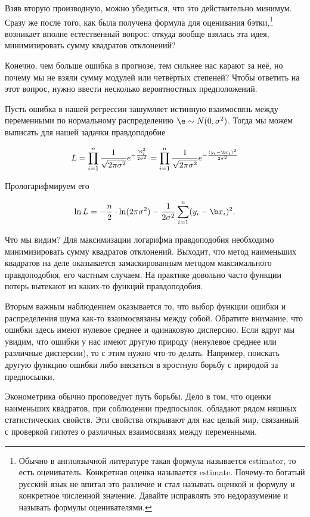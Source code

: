 \documentclass[12pt, a4paper, oneside]{article}
\begin{document}
Взяв вторую производную, можно убедиться, что это действительно минимум.  Сразу же после того, как была получена формула для оценивания бэтки,\footnote{Обычно в англоязычной литературе такая формула называется estimator, то есть оцениватель. Конкретная оценка называется estimate. Почему-то богатый русский язык не впитал это различие и стал называть оценкой и формулу и конкретное численной значение. Давайте исправлять это недоразумение и называть формулы оценивателями.} возникает вполне естественный вопрос: откуда вообще взялась эта идея, минимизировать сумму квадратов отклонений?  

Конечно, чем больше ошибка в прогнозе, тем сильнее нас карают за неё, но почему мы не взяли сумму модулей или четвёртых степеней?  Чтобы ответить на этот вопрос, нужно ввести несколько вероятностных предположений. 

Пусть ошибка в нашей регрессии  зашумляет истинную взаимосвязь между переменными по нормальному распределению $\e \sim N(0, \sigma^2)$. Тогда мы можем выписать для нашей задачки  правдоподобие

\[ L =  \prod_{i=1}^{n} \frac{1}{\sqrt{2\pi \sigma^2}} e^{- \frac{\e_i^2}{2 \sigma^2}   } =  \prod_{i=1}^{n} \frac{1}{\sqrt{2\pi \sigma^2}} e^{- \frac{(y_i - \b x_i)^2}{2 \sigma^2}   } \]

Прологарифмируем его

\[ \ln L = -\frac{n}{2} \cdot \ln(2 \pi \sigma^2) - \frac{1}{2\sigma^2} \sum_{i=1}^n (y_i - \b x_i)^2. \]

Что мы видим? Для максимизации логарифма правдоподобия необходимо минимизировать сумму квадратов отклонений. Выходит, что метод наименьших квадратов на деле оказывается замаскированным методом максимального правдоподобия, его частным случаем. На практике довольно часто функции потерь вытекают из каких-то функций правдоподобия. 

Вторым важным наблюдением оказывается то, что выбор функции ошибки и распределения шума как-то взаимосвязаны между собой.  Обратите внимание, что ошибки здесь имеют нулевое среднее и одинаковую дисперсию. Если вдруг мы увидим, что ошибки у нас имеют другую природу (ненулевое среднее или различные дисперсии), то с этим нужно что-то делать. Например, поискать другую функцию ошибки либо ввязаться в яростную борьбу с природой за предпосылки. 

Эконометрика обычно проповедует путь борьбы. Дело в том, что оценки наименьших квадратов, при соблюдении предпосылок, обладают рядом няшных статистических свойств. Эти свойства открывают для нас целый мир, связанный с проверкой гипотез о различных взаимосвязях между переменными. 
\end{document}
